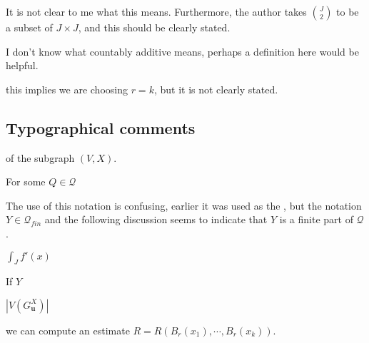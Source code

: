 \documentclass[12pt]{article}
\begin{document}
\begin{itemize}
It is not clear to me what this means. Furthermore, the author takes $\binom{J}{2}$ to be a subset of $J\times J$, and this should be clearly stated.

I don't know what countably additive means, perhaps a definition here would be helpful.

 this implies we are choosing $r = k$, but it is not clearly stated.

\end{itemize}


\subsection*{Typographical comments}

\begin{itemize}
 of the subgraph $(V, X)$.

 For some $Q \in \mathcal Q$

 The use of this notation is confusing, earlier it was used as the , but the notation $Y\in \mathcal Q_{fin}$ and the following discussion seems to indicate that $Y$ is a finite part of $\mathcal Q$.

 $\int_J f'(x)$


 If $Y$

 $|V(G_{\mathbf{u}}^X)|$

 we can compute an estimate $R = R(B_r(x_1), \cdots , B_r(x_k))$.

\end{itemize}




\end{document}
